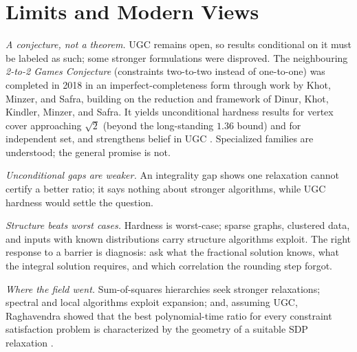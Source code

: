 \section{Limits and Modern Views}
\emph{A conjecture, not a theorem.} UGC remains open, so results conditional on it must be labeled as such; some stronger formulations were disproved. The neighbouring \emph{2-to-2 Games Conjecture} (constraints two-to-two instead of one-to-one) was completed in 2018 in an imperfect-completeness form through work by Khot, Minzer, and Safra, building on the reduction and framework of Dinur, Khot, Kindler, Minzer, and Safra. It yields unconditional hardness results for vertex cover approaching $\sqrt2$ (beyond the long-standing $1.36$ bound) and for independent set, and strengthens belief in UGC \cite{dkkms-2to2,kms-2to2}. Specialized families are understood; the general promise is not.

\emph{Unconditional gaps are weaker.} An integrality gap shows one relaxation cannot certify a better ratio; it says nothing about stronger algorithms, while UGC hardness would settle the question.

\emph{Structure beats worst cases.} Hardness is worst-case; sparse graphs, clustered data, and inputs with known distributions carry structure algorithms exploit. The right response to a barrier is diagnosis: ask what the fractional solution knows, what the integral solution requires, and which correlation the rounding step forgot.

\emph{Where the field went.} Sum-of-squares hierarchies seek stronger relaxations; spectral and local algorithms exploit expansion; and, assuming UGC, Raghavendra showed that the best polynomial-time ratio for every constraint satisfaction problem is characterized by the geometry of a suitable SDP relaxation \cite{raghavendra-csp}.

